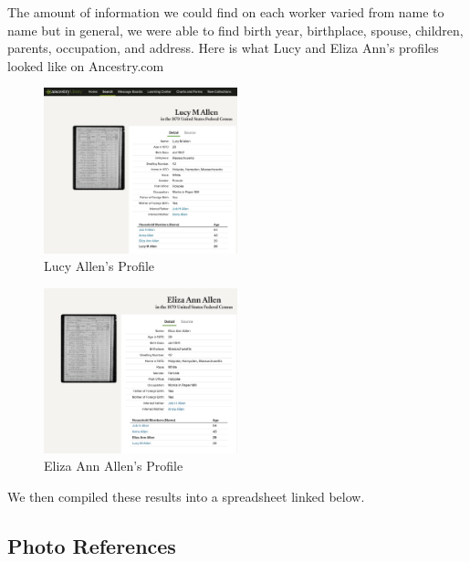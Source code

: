 \documentclass[
  letterpaper,
  DIV=11,
  numbers=noendperiod]{scrartcl}
\begin{document}
The amount of information we could find on each worker varied from name
to name but in general, we were able to find birth year, birthplace,
spouse, children, parents, occupation, and address. Here is what Lucy
and Eliza Ann's profiles looked like on Ancestry.com

\begin{figure}

{\centering \includegraphics[width=0.5\textwidth,height=\textheight]{Lucy_Allen.jpeg}

}

\caption{\label{fig-sample5}Lucy Allen's Profile}

\end{figure}

\begin{figure}

{\centering \includegraphics[width=0.5\textwidth,height=\textheight]{ELIZA_ANN.png}

}

\caption{\label{fig-sample6}Eliza Ann Allen's Profile}

\end{figure}

We then compiled these results into a spreadsheet linked below.

\hypertarget{photo-references}{%
\subsection{Photo References}\label{photo-references}}
\end{document}

